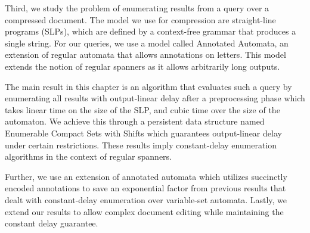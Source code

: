 Third, we study the problem of enumerating results from a query over a compressed document. The model we use for compression are straight-line programs (SLPs), which are defined by a context-free grammar that produces a single string. For our queries, we use a model called Annotated Automata, an extension of regular automata that allows annotations on letters. This model extends the notion of regular spanners as it allows arbitrarily long outputs. 

The main result in this chapter is an algorithm that evaluates such a query by enumerating all results with output-linear delay after a preprocessing phase which takes linear time on the size of the SLP, and cubic time over the size of the automaton. We achieve this through a persistent data structure named Enumerable Compact Sets with Shifts which guarantees output-linear delay under certain restrictions.
These results imply constant-delay enumeration algorithms in the context of regular spanners. 

Further, we use an extension of annotated automata which utilizes succinctly encoded annotations to save an exponential factor from previous results that dealt with constant-delay enumeration over variable-set automata.
Lastly, we extend our results to allow complex document editing while maintaining the constant delay guarantee.
